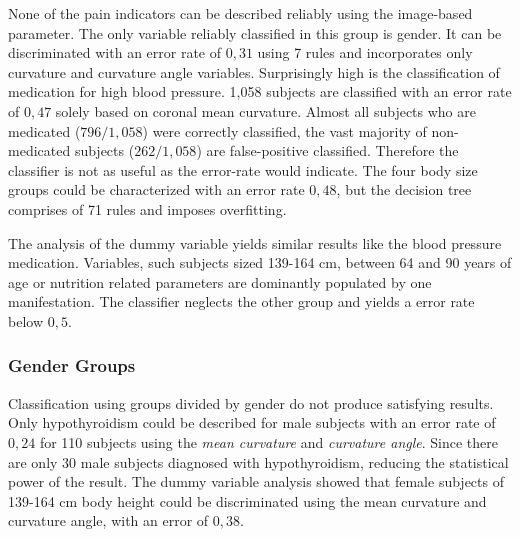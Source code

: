 \documentclass[a4paper,twoside]{style/article}
\begin{document}
None of the pain indicators can be described reliably using the image-based parameter.
The only variable reliably classified in this group is gender.%
%
It can be discriminated with an error rate of $0,31$ using 7 rules and incorporates only curvature and curvature angle variables.
%
Surprisingly high is the classification of medication for high blood pressure.
1,058 subjects are classified with an error rate of $0,47$ solely based on coronal mean curvature.
Almost all subjects who are medicated ($796/1,058$) were correctly classified, the vast majority of non-medicated subjects ($262/1,058$) are false-positive classified.
Therefore the classifier is not as useful as the error-rate would indicate.
The four body size groups could be characterized with an error rate $0,48$, but the decision tree comprises of 71 rules and imposes overfitting.

The analysis of the dummy variable yields similar results like the blood pressure medication.
Variables, such subjects sized 139-164 cm, between 64 and 90 years of age or nutrition related parameters are dominantly populated by one manifestation.
The classifier neglects the other group and yields a error rate below $0,5$.
\subsubsection{Gender Groups}
Classification using groups divided by gender do not produce satisfying results.
Only hypothyroidism could be described for male subjects with an error rate of $0,24$ for 110 subjects using the \emph{mean curvature} and \emph{curvature angle}.
Since there are only 30 male subjects diagnosed with hypothyroidism, reducing the statistical power of the result.
The dummy variable analysis showed that female subjects of 139-164 cm body height could be discriminated using the mean curvature and curvature angle, with an error of $0,38$.
\end{document}
